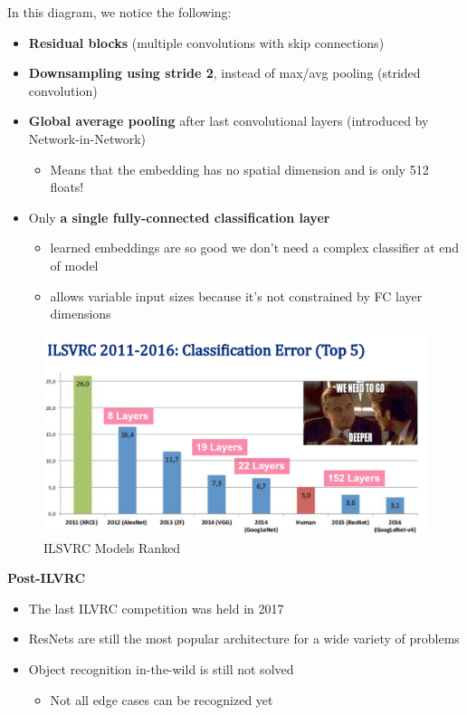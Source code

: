In this diagram, we notice the following:
\begin{itemize}
    \item \textbf{Residual blocks} (multiple convolutions with skip connections)
    \item \textbf{Downsampling using stride 2}, instead of max/avg pooling (strided convolution)
    \item \textbf{Global average pooling} after last convolutional layers (introduced by Network-in-Network)
    \begin{itemize}
        \item Means that the embedding has no spatial dimension and is only 512 floats!
    \end{itemize}
    \item Only \textbf{a single fully-connected classification layer}
    \begin{itemize}
        \item learned embeddings are so good we don't need a complex classifier at end of model
        \item allows variable input sizes because it's not constrained by FC layer dimensions
    \end{itemize}
\end{itemize}

\begin{figure}[h!t]
    \centering
    \includegraphics[width=0.5\linewidth]{modelsranked.png}
    \caption{ILSVRC Models Ranked}
    \label{fig:enter-label}
\end{figure}

\textbf{Post-ILVRC}
\begin{itemize}
    \item The last ILVRC competition was held in 2017
    \item ResNets are still the most popular architecture for a wide variety of problems
    \item Object recognition in-the-wild is still not solved
    \begin{itemize}
        \item Not all edge cases can be recognized yet
    \end{itemize}
\end{itemize}


